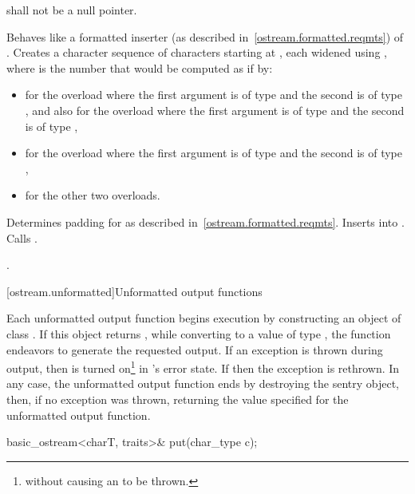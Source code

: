 \begin{itemdescr}
\pnum
\requires
{} shall not be a null pointer.

\pnum
\effects
Behaves like a formatted inserter (as described in~\ref{ostream.formatted.reqmts}) of .
Creates a character sequence  of  characters
starting at , each widened using
,
where  is the number that would be computed as if by:
\begin{itemize}
\item
{}
for the overload where the first argument is of type
and the second is of type
,
and also for the overload where the first argument is of type
and the second is of type
,
\item
{}
for the overload where the first argument is of type
and the second is of type
,
\item
{}
for the other two overloads.
\end{itemize}
Determines padding for  as described
in~\ref{ostream.formatted.reqmts}. Inserts  into
. Calls .

\pnum
\returns
{}.
\end{itemdescr}

[ostream.unformatted]{Unformatted output functions}

\pnum
Each
unformatted
output function begins execution by constructing an object of class
.
If this object returns
,
while converting to a value of type
,
the function endeavors
to generate the requested output.
If an exception is thrown during output, then
is turned on\footnote{without causing an
to be thrown.}
in
's
error state.
If
then the exception is rethrown.
In any case, the unformatted output function ends by destroying the
sentry object, then, if no exception was thrown, returning the value
specified for the unformatted output function.

%
\begin{itemdecl}
basic_ostream<charT, traits>& put(char_type c);
\end{itemdecl}

